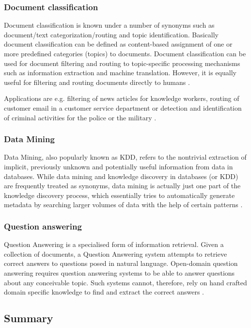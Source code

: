 \subsubsection{Document classification}
Document classification is known under a number of synonyms such as document/text categorization/routing and topic identification. Basically document classification can be defined as content-based assignment of one or more predefined categories (topics) to documents. Document classification can be used for document filtering and routing to topic-specific processing mechanisms such as information extraction and machine translation. However, it is equally useful for filtering and routing documents directly to humans \cite{Knorz:2000}.

Applications are e.g. filtering of news articles for knowledge workers, routing of customer email in a customer service department or detection and identification of criminal activities for the police or the military \cite{Knorz:2000}.

\subsubsection{Data Mining}
Data Mining, also popularly known as \gls{KDD}, refers to the nontrivial extraction of implicit, previously unknown and potentially useful information from data in databases. While data mining and knowledge discovery in databases (or KDD) are frequently treated as synonyms, data mining is actually just one part of the knowledge discovery process, which essentially tries to automatically generate metadata by searching larger volumes of data with the help of certain patterns \cite{Zaiane:1999}. 

\subsubsection{Question answering}
Question Answering is a specialised form of information retrieval. Given a collection of documents, a Question Answering system attempts to retrieve correct answers to questions posed in natural language. Open-domain question answering requires question answering systems to be able to answer questions about any conceivable topic. Such systems cannot, therefore, rely on hand crafted domain specific knowledge to find and extract the correct answers \cite{Lampert:2004}.

\subsection{Summary}
